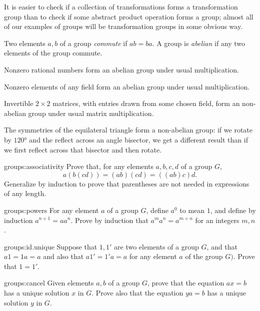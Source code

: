 It is easier to check if a collection of transformations forms a transformation group than to check if some abstract product operation forms a group; almost all of our examples of groups will be transformation groups in some obvious way.

Two elements \(a,b\) of a group \emph{commute} if \(ab=ba\).
A group is \emph{abelian} if any two elements of the group commute.

\begin{example}
Nonzero rational numbers form an abelian group under usual multiplication.
\end{example}
\begin{example}
Nonzero elements of any field form an abelian group under usual multiplication.
\end{example}
\begin{example}
Invertible \(2 \times 2\) matrices, with entries drawn from some chosen field, form an non-abelian group under usual matrix multiplication.
\end{example}
\begin{example}
The symmetries of the equilateral triangle form a non-abelian group: if we rotate by \(120\si{\degree}\) and the reflect across an angle bisector, we get a different result than if we first reflect across that bisector and then rotate.
\end{example}


\begin{problem}{groups:associativity}
Prove that, for any elements \(a,b,c,d\) of a group \(G\), 
\[
a(b(cd))=(ab)(cd)=((ab)c)d.
\]
Generalize by induction to prove that parentheses are not needed in expressions of any length.
\end{problem}

\begin{problem}{groups:powers}
For any element \(a\) of a group \(G\), define \(a^0\) to mean \(1\), and define by induction \(a^{n+1}=aa^n\).
Prove by induction that \(a^ma^n=a^{m+n}\) for an integers \(m,n\).
\end{problem}

\begin{problem}{groups:id.unique}
Suppose that \(1,1'\) are two elements of a group \(G\), and that \(a1=1a=a\) and also that \(a1'=1'a=a\) for any element \(a\) of the group \(G)\).
Prove that \(1=1'\).
\end{problem}

\begin{problem}{groups:cancel}
Given elements \(a, b\) of a group \(G\), prove that the equation \(ax=b\) has a unique solution \(x\) in \(G\).
Prove also that the equation \(ya=b\) has a unique solution \(y\) in \(G\).
\end{problem}

